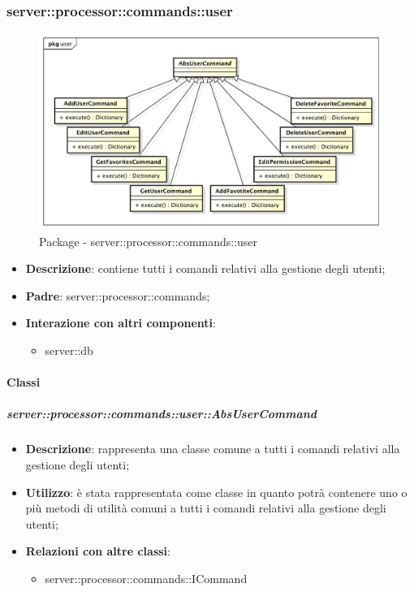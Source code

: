       \subsubsection{server::processor::commands::user} %
      \label{ssub:bdsm_app_server_processor_commands_user}
      \begin{figure}[!htbp]
      	\centering
      	\centerline{\includegraphics[scale=0.5]{./images/server/user.pdf}}
      	\caption{Package - server::processor::commands::user}
      \end{figure}

      \begin{itemize}
        \item \textbf{Descrizione}: contiene tutti i comandi relativi alla gestione degli utenti;
        \item \textbf{Padre}: server::processor::commands;
        \item \textbf{Interazione con altri componenti}:
          \begin{itemize}
            \item server::db
          \end{itemize}
      \end{itemize}

        \paragraph{Classi} %

        \subparagraph{server::processor::commands::user::AbsUserCommand} %
        \label{subp:bdsm_app_server_processor_commands_user_absusercommand}
        \begin{itemize}
          \item \textbf{Descrizione}: rappresenta una classe comune a tutti i comandi relativi alla gestione degli utenti;
          \item \textbf{Utilizzo}: è stata rappresentata come classe in quanto potrà contenere uno o più metodi di utilità comuni a tutti i comandi relativi alla gestione degli utenti;
          \item \textbf{Relazioni con altre classi}:
            \begin{itemize}
              \item server::processor::commands::ICommand
            \end{itemize}
        \end{itemize}

